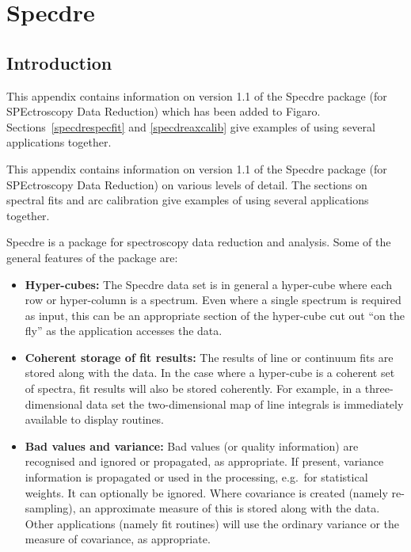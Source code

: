 \documentclass[11pt,twoside]{article}
\newcommand{\stardocinitials}  {SUN}
\newcommand{\stardocnumber}    { 86.21}
\newcommand{\stardocname}{\stardocinitials /\stardocnumber}
\newenvironment{latexonly}{}{}
\newcommand{\htmlref}[2]{#1}
\newcommand{\xlabel}[1]{}
\begin{document}

\newpage %
\section{\label{specdre}\xlabel{specdre}Specdre}
\markboth{Specdre}{\stardocname}

\subsection{\label{specdreintro}\xlabel{specdreintro}Introduction}

\begin{latexonly}
   This appendix contains information on version 1.1 of the Specdre
   package (for SPEctroscopy Data Reduction) which has been added to Figaro.
   Sections~\ref{specdrespecfit} and \ref{specdreaxcalib}
   give examples of using several applications together.
\end{latexonly}

\begin{htmlonly}
   This appendix contains information on version 1.1 of the Specdre
   package (for SPEctroscopy Data Reduction) on various levels of
   detail. The sections on
\htmlref{spectral fits}{specfit}
   and
\htmlref{arc calibration}{axcalib}
   give examples of using several applications together.
\end{htmlonly}

   Specdre is a package for spectroscopy data reduction and analysis.
   Some of the general features of the package are:

\begin{itemize}
\item {\bf Hyper-cubes:} The Specdre data set is in general a hyper-cube
   where each row or hyper-column is a spectrum. Even where a single
   spectrum is required as input, this can be an appropriate section of
   the hyper-cube cut out ``on the fly'' as the application accesses the
   data.
\item {\bf Coherent storage of fit results:} The results of line or
   continuum fits are stored along with the data. In the case where a
   hyper-cube is a coherent set of spectra, fit results will also be
   stored coherently. For example, in a three-dimensional data set the
   two-dimensional map of line integrals is immediately available to
   display routines.
\item {\bf Bad values and variance:} Bad values (or quality information)
   are recognised and ignored or propagated, as appropriate. If present,
   variance information is propagated or used in the processing,
   e.g.\ for statistical weights. It can optionally be ignored. Where
   covariance is created (namely re-sampling), an approximate measure of
   this is stored along with the data. Other applications (namely fit
   routines) will use the ordinary variance or the measure of
   covariance, as appropriate.
\end{itemize}
\end{document}
